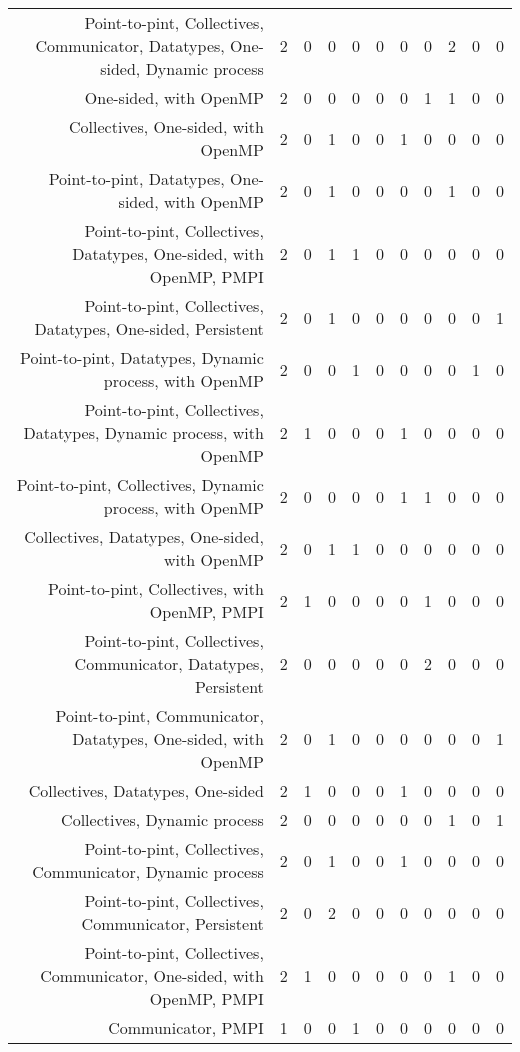 {\begin{landscape}
\begin{longtable}[htb]{r|c|c|c|c|c|c|c|c|c|c}
{Point-to-pint, Collectives, Communicator, Datatypes, One-sided, Dynamic process} & 2 & 0 & 0 & 0 & 0 & 0 & 0 & 2 & 0 & 0 \\%
{One-sided, with OpenMP} & 2 & 0 & 0 & 0 & 0 & 0 & 1 & 1 & 0 & 0 \\%
{Collectives, One-sided, with OpenMP} & 2 & 0 & 1 & 0 & 0 & 1 & 0 & 0 & 0 & 0 \\%
{Point-to-pint, Datatypes, One-sided, with OpenMP} & 2 & 0 & 1 & 0 & 0 & 0 & 0 & 1 & 0 & 0 \\%
{Point-to-pint, Collectives, Datatypes, One-sided, with OpenMP, PMPI} & 2 & 0 & 1 & 1 & 0 & 0 & 0 & 0 & 0 & 0 \\%
{Point-to-pint, Collectives, Datatypes, One-sided, Persistent} & 2 & 0 & 1 & 0 & 0 & 0 & 0 & 0 & 0 & 1 \\%
{Point-to-pint, Datatypes, Dynamic process, with OpenMP} & 2 & 0 & 0 & 1 & 0 & 0 & 0 & 0 & 1 & 0 \\%
{Point-to-pint, Collectives, Datatypes, Dynamic process, with OpenMP} & 2 & 1 & 0 & 0 & 0 & 1 & 0 & 0 & 0 & 0 \\%
{Point-to-pint, Collectives, Dynamic process, with OpenMP} & 2 & 0 & 0 & 0 & 0 & 1 & 1 & 0 & 0 & 0 \\%
{Collectives, Datatypes, One-sided, with OpenMP} & 2 & 0 & 1 & 1 & 0 & 0 & 0 & 0 & 0 & 0 \\%
{Point-to-pint, Collectives, with OpenMP, PMPI} & 2 & 1 & 0 & 0 & 0 & 0 & 1 & 0 & 0 & 0 \\%
{Point-to-pint, Collectives, Communicator, Datatypes, Persistent} & 2 & 0 & 0 & 0 & 0 & 0 & 2 & 0 & 0 & 0 \\%
{Point-to-pint, Communicator, Datatypes, One-sided, with OpenMP} & 2 & 0 & 1 & 0 & 0 & 0 & 0 & 0 & 0 & 1 \\%
{Collectives, Datatypes, One-sided} & 2 & 1 & 0 & 0 & 0 & 1 & 0 & 0 & 0 & 0 \\%
{Collectives, Dynamic process} & 2 & 0 & 0 & 0 & 0 & 0 & 0 & 1 & 0 & 1 \\%
{Point-to-pint, Collectives, Communicator, Dynamic process} & 2 & 0 & 1 & 0 & 0 & 1 & 0 & 0 & 0 & 0 \\%
{Point-to-pint, Collectives, Communicator, Persistent} & 2 & 0 & 2 & 0 & 0 & 0 & 0 & 0 & 0 & 0 \\%
{Point-to-pint, Collectives, Communicator, One-sided, with OpenMP, PMPI} & 2 & 1 & 0 & 0 & 0 & 0 & 0 & 1 & 0 & 0 \\%
{Communicator, PMPI} & 1 & 0 & 0 & 1 & 0 & 0 & 0 & 0 & 0 & 0 \\%

\end{longtable}
\end{landscape}}
